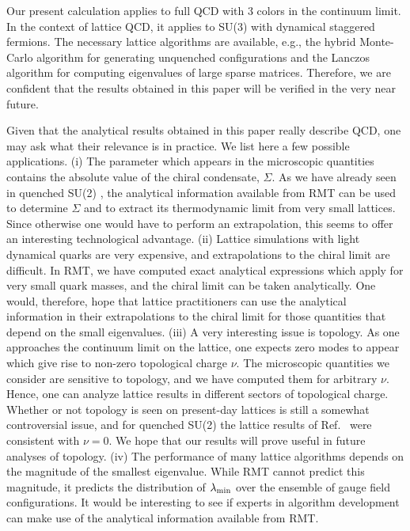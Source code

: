 Our present calculation applies to full QCD with 3 colors in the
continuum limit.  In the context of lattice QCD, it applies to SU(3)
with dynamical staggered fermions.  The necessary lattice algorithms
are available, e.g., the hybrid Monte-Carlo algorithm for generating
unquenched configurations and the Lanczos algorithm for computing
eigenvalues of large sparse matrices.  Therefore, we are confident
that the results obtained in this paper will be verified in the very
near future.

Given that the analytical results obtained in this paper really
describe QCD, one may ask what their relevance is in practice.  We
list here a few possible applications.  (i) The parameter which
appears in the microscopic quantities contains the absolute value of
the chiral condensate, $\Sigma$.  As we have already seen in quenched
SU(2) \cite{Berb97b}, the analytical information available from RMT
can be used to determine $\Sigma$ and to extract its thermodynamic
limit from very small lattices.  Since otherwise one would have to
perform an extrapolation, this seems to offer an interesting
technological advantage.  (ii) Lattice simulations with light
dynamical quarks are very expensive, and extrapolations to the chiral
limit are difficult.  In RMT, we have computed exact analytical
expressions which apply for very small quark masses, and the chiral
limit can be taken analytically.  One would, therefore, hope that
lattice practitioners can use the analytical information in their
extrapolations to the chiral limit for those quantities that depend on
the small eigenvalues.  (iii) A very interesting issue is topology.
As one approaches the continuum limit on the lattice, one expects zero
modes to appear which give rise to non-zero topological charge $\nu$.
The microscopic quantities we consider are sensitive to topology, and
we have computed them for arbitrary $\nu$.  Hence, one can analyze
lattice results in different sectors of topological charge.  Whether
or not topology is seen on present-day lattices is still a somewhat
controversial issue, and for quenched SU(2) the lattice results of
Ref.~\cite{Berb97a} were consistent with $\nu=0$.  We hope that our
results will prove useful in future analyses of topology.  (iv) The
performance of many lattice algorithms depends on the magnitude of the
smallest eigenvalue.  While RMT cannot predict this magnitude, it
predicts the distribution of $\lambda_{\rm min}$ over the ensemble of
gauge field configurations.  It would be interesting to see if experts
in algorithm development can make use of the analytical information
available from RMT.



